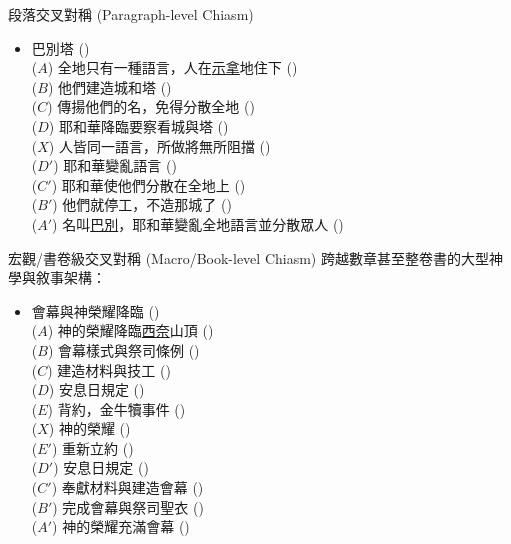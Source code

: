 \documentclass{beamer}
\begin{document}
\begin{frame}{段落交叉對稱 (Paragraph-level Chiasm)}
  \begin{itemize}
    \item 巴別塔 ()\\
      \quad($A$) 全地只有一種語言，人在\uline{示拿}地住下 ()\\
      \quad\quad($B$) 他們建造城和塔 ()\\
      \quad\quad\quad($C$) 傳揚他們的名，免得分散全地 ()\\
      \quad\quad\quad\quad($D$) 耶和華降臨要察看城與塔 ()\\
      \quad\quad\quad\quad\quad($X$) 人皆同一語言，所做將無所阻擋 ()\\
      \quad\quad\quad\quad($D'$) 耶和華變亂語言 ()\\
      \quad\quad\quad($C'$) 耶和華使他們分散在全地上 ()\\
      \quad\quad($B'$) 他們就停工，不造那城了 ()\\
      \quad($A'$) 名叫\uline{巴別}，耶和華變亂全地語言並分散眾人 ()
  \end{itemize}
\end{frame}

\begin{frame}{宏觀/書卷級交叉對稱 (Macro/Book-level Chiasm)}
  跨越數章甚至整卷書的大型神學與敘事架構：
  \begin{itemize}
    \item 會幕與神榮耀降臨 ()\\
      \quad($A$) 神的榮耀降臨\uline{西奈}山頂 ()\\
      \quad\quad($B$) 會幕樣式與祭司條例 ()\\
      \quad\quad\quad($C$) 建造材料與技工 ()\\
      \quad\quad\quad\quad($D$) 安息日規定 ()\\
      \quad\quad\quad\quad\quad($E$) 背約，金牛犢事件 ()\\
      \quad\quad\quad\quad\quad\quad($X$) 神的榮耀 ()\\
      \quad\quad\quad\quad\quad($E'$) 重新立約 ()\\
      \quad\quad\quad\quad($D'$) 安息日規定 ()\\
      \quad\quad\quad($C'$) 奉獻材料與建造會幕 ()\\
      \quad\quad($B'$) 完成會幕與祭司聖衣 ()\\
      \quad($A'$) 神的榮耀充滿會幕 ()
  \end{itemize}
\end{frame}
\end{document}

